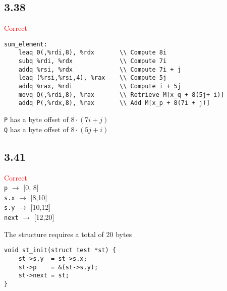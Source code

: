 \subsection*{3.38}
\textcolor{red}{Correct}
\begin{verbatim}
sum_element:
    leaq 0(,%rdi,8), %rdx       \\ Compute 8i
    subq %rdi, %rdx             \\ Compute 7i
    addq %rsi, %rdx             \\ Compute 7i + j
    leaq (%rsi,%rsi,4), %rax    \\ Compute 5j
    addq %rax, %rdi             \\ Compute i + 5j
    movq Q(,%rdi,8), %rax       \\ Retrieve M[x_q + 8(5j+ i)]
    addq P(,%rdx,8), %rax       \\ Add M[x_p + 8(7i + j)]
\end{verbatim}

\noindent
\verb+P+ has a byte offset of $8\cdot(7i+j)$\\
\verb+Q+ has a byte offset of $8\cdot(5j+i)$

\subsection*{3.41}
\textcolor{red}{Correct}\\
\verb+p+ $\rightarrow$ [0, 8]\\
\verb+s.x+ $\rightarrow$ [8,10]\\
\verb+s.y+ $\rightarrow$ [10,12]\\
\verb+next+ $\rightarrow$ [12,20]

\noindent
The structure requires a total of 20 bytes

\begin{verbatim}
void st_init(struct test *st) {
    st->s.y  = st->s.x;
    st->p    = &(st->s.y);
    st->next = st;
}
\end{verbatim}
